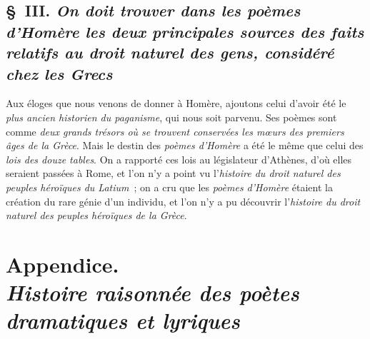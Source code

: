 \documentclass[french,twoside]{book} %
\newcommand\chapteropen{} %
\newcommand\chapterclose{} %
\begin{document}
\section[{§ III. On doit trouver dans les poèmes d’Homère les deux principales sources des faits relatifs au droit naturel des gens, considéré chez les Grecs}]{§ III. {\itshape On doit trouver dans les poèmes d’Homère les deux principales sources des faits relatifs au droit naturel des gens, considéré chez les Grecs}}
\noindent Aux éloges que nous venons de donner à Homère, ajoutons celui d’avoir été le {\itshape plus ancien historien du paganisme}, qui nous soit parvenu. Ses poèmes sont comme {\itshape deux grands trésors où se trouvent conservées les mœurs des premiers âges de la Grèce}. Mais le destin des {\itshape poèmes d’Homère} a été le même que celui des {\itshape lois des douze tables}. On a rapporté ces lois au législateur d’Athènes, d’où elles seraient passées à Rome, et l’on n’y a point vu  l’{\itshape histoire du droit naturel des peuples héroïques du Latium} ; on a cru que les {\itshape poèmes d’Homère} étaient la création du rare génie d’un individu, et l’on n’y a pu découvrir l’{\itshape histoire du droit naturel des peuples héroïques de la Grèce}.
\chapterclose


\chapteropen
\chapter[{Appendice. Histoire raisonnée des poètes dramatiques et lyriques}]{Appendice. \\
{\itshape Histoire raisonnée des poètes dramatiques et lyriques}}
\end{document}
